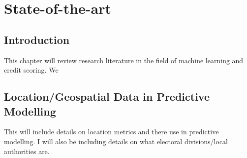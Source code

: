 
\chapter{State-of-the-art} %

\label{Chapter2} %


\section{Introduction}
This chapter will review research literature in the field of machine learning and credit scoring. We 


\section{Location/Geospatial Data in Predictive Modelling}
This will include details on location metrics and there use in predictive modelling. I will also be including details on what electoral divisions/local authorities are.


